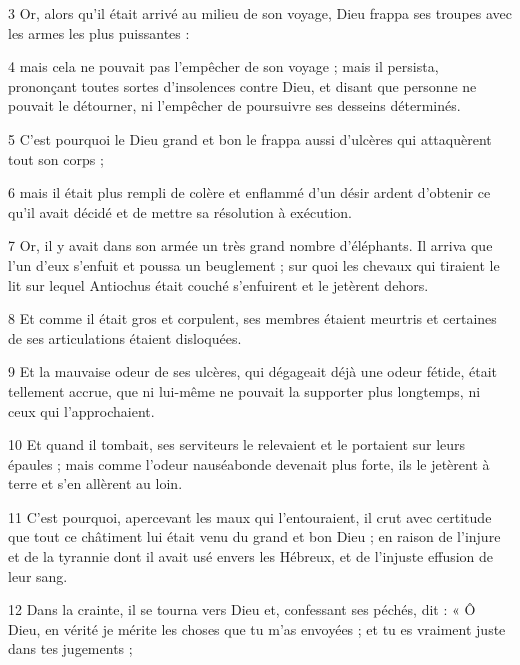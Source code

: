 \par 3 Or, alors qu'il était arrivé au milieu de son voyage, Dieu frappa ses troupes avec les armes les plus puissantes :

\par 4 mais cela ne pouvait pas l'empêcher de son voyage ; mais il persista, prononçant toutes sortes d'insolences contre Dieu, et disant que personne ne pouvait le détourner, ni l'empêcher de poursuivre ses desseins déterminés.

\par 5 C'est pourquoi le Dieu grand et bon le frappa aussi d'ulcères qui attaquèrent tout son corps ;

\par 6 mais il était plus rempli de colère et enflammé d'un désir ardent d'obtenir ce qu'il avait décidé et de mettre sa résolution à exécution.

\par 7 Or, il y avait dans son armée un très grand nombre d'éléphants. Il arriva que l'un d'eux s'enfuit et poussa un beuglement ; sur quoi les chevaux qui tiraient le lit sur lequel Antiochus était couché s'enfuirent et le jetèrent dehors.

\par 8 Et comme il était gros et corpulent, ses membres étaient meurtris et certaines de ses articulations étaient disloquées.

\par 9 Et la mauvaise odeur de ses ulcères, qui dégageait déjà une odeur fétide, était tellement accrue, que ni lui-même ne pouvait la supporter plus longtemps, ni ceux qui l'approchaient.

\par 10 Et quand il tombait, ses serviteurs le relevaient et le portaient sur leurs épaules ; mais comme l'odeur nauséabonde devenait plus forte, ils le jetèrent à terre et s'en allèrent au loin.

\par 11 C'est pourquoi, apercevant les maux qui l'entouraient, il crut avec certitude que tout ce châtiment lui était venu du grand et bon Dieu ; en raison de l'injure et de la tyrannie dont il avait usé envers les Hébreux, et de l'injuste effusion de leur sang.

\par 12 Dans la crainte, il se tourna vers Dieu et, confessant ses péchés, dit : « Ô Dieu, en vérité je mérite les choses que tu m’as envoyées ; et tu es vraiment juste dans tes jugements ;


